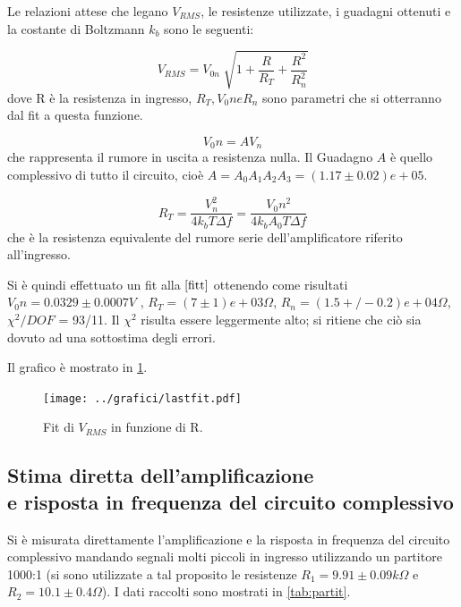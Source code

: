\documentclass[a4paper,10pt]{article}
\begin{document}
Le relazioni attese che legano $V_{RMS}$, le resistenze utilizzate, i guadagni ottenuti e la costante di Boltzmann $k_b$ sono le seguenti:

\begin{equation}
V_{RMS} = V_{0n} \sqrt[]{1+\frac{R}{R_T}+\frac{R^2}{R_n ^2}}
\label{fitt}
\end{equation}
dove R è la resistenza in ingresso, $R_T, V_0n e R_n$ sono parametri che si otterranno dal fit a questa funzione.

\begin{equation}
V_0n = A V_n
\label{resnull}
\end{equation}
 che rappresenta il rumore in uscita a resistenza nulla. Il Guadagno $A$ è quello complessivo di tutto il circuito, cioè $A = A_0 A_1 A_2 A_3 = (1.17\pm0.02)e+05 $.
 
 \begin{equation}
 R_T = \frac{V_n^2}{4k_b T \Delta f} = \frac{V_0n^2}{4k_b A_0 T \Delta f}
 \label{kb}
 \end{equation}
  che è la resistenza equivalente del rumore serie dell'amplificatore riferito all'ingresso.

Si è quindi effettuato un fit alla $\eqref{fitt}$ ottenendo come risultati $V_0n = 0.0329\pm0.0007 V$ , $R_T = (7\pm1)e+03 \Omega $, $R_n = (1.5+/-0.2)e+04 \Omega$, $\chi ^2 /DOF$ = 93/11. Il $\chi ^2$ risulta essere leggermente alto; si ritiene che ciò sia dovuto ad una sottostima degli errori.

Il grafico è mostrato in \cref{fig:lastfit}.


\begin{figure}[H]
	\centering
	\texttt{[image: ../grafici/lastfit.pdf]}
	\caption{Fit di $V_{RMS}$ in funzione di R.}
	\label{fig:lastfit}
\end{figure}



\subsection{Stima diretta dell'amplificazione \\e risposta in frequenza del circuito complessivo}
Si è misurata direttamente l'amplificazione e la risposta in frequenza del circuito complessivo mandando segnali molti piccoli in ingresso utilizzando un partitore 1000:1 (si sono utilizzate a tal proposito le resistenze $R_1 = 9.91\pm0.09 k\Omega $ e $R_2 = 10.1\pm0.4 \Omega$).
I dati raccolti sono mostrati in \cref{tab:partit}.
\end{document}
